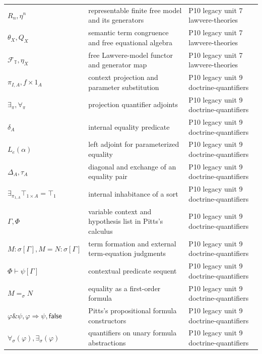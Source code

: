 \begin{longtable}{@{}p{}p{}p{}@{}}
\(R_n,\allowbreak \eta^n\) & representable finite free model and its generators & P10 legacy unit 7 lawvere-\allowbreak{}theories \\
\(\theta_X,\allowbreak Q_X\) & semantic term congruence and free equational algebra & P10 legacy unit 7 lawvere-\allowbreak{}theories \\
\(\mathcal F_{\mathbb T},\allowbreak \eta_X\) & free Lawvere-model functor and generator map & P10 legacy unit 7 lawvere-\allowbreak{}theories \\
\(\pi_{I,A},\allowbreak f\times1_A\) & context projection and parameter substitution & P10 legacy unit 9 doctrine-\allowbreak{}quantifiers \\
\(\exists_\pi,\allowbreak \forall_\pi\) & projection quantifier adjoints & P10 legacy unit 9 doctrine-\allowbreak{}quantifiers \\
\(\delta_A\) & internal equality predicate & P10 legacy unit 9 doctrine-\allowbreak{}quantifiers \\
\(L_e(\alpha)\) & left adjoint for parameterized equality & P10 legacy unit 9 doctrine-\allowbreak{}quantifiers \\
\(\Delta_A,\allowbreak \tau_A\) & diagonal and exchange of an equality pair & P10 legacy unit 9 doctrine-\allowbreak{}quantifiers \\
\(\exists_{\pi_{1,A}}\top_{1\times A}=\top_1\) & internal inhabitance of a sort & P10 legacy unit 9 doctrine-\allowbreak{}quantifiers \\
\(\Gamma,\allowbreak \Phi\) & variable context and hypothesis list in Pitts's calculus & P10 legacy unit 9 doctrine-\allowbreak{}quantifiers \\
\(M:\sigma[\Gamma],\allowbreak M=N:\sigma[\Gamma]\) & term formation and external term-equation judgments & P10 legacy unit 9 doctrine-\allowbreak{}quantifiers \\
\(\Phi\vdash\psi[\Gamma]\) & contextual predicate sequent & P10 legacy unit 9 doctrine-\allowbreak{}quantifiers \\
\(M=_\sigma N\) & equality as a first-order formula & P10 legacy unit 9 doctrine-\allowbreak{}quantifiers \\
\(\varphi\mathbin{\&}\psi,\allowbreak \varphi\Rightarrow\psi,\allowbreak \mathsf{false}\) & Pitts's propositional formula constructors & P10 legacy unit 9 doctrine-\allowbreak{}quantifiers \\
\(\forall_\sigma(\varphi),\allowbreak \exists_\sigma(\varphi)\) & quantifiers on unary formula abstractions & P10 legacy unit 9 doctrine-\allowbreak{}quantifiers \\

\end{longtable}
